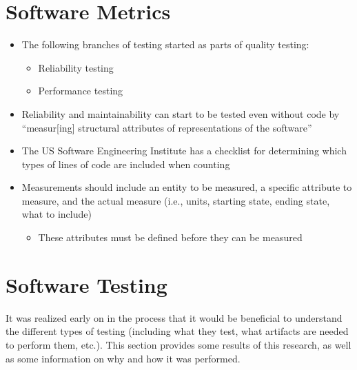 \section{Software Metrics}
\label{chap:notes:sec:software-metrics}

\begin{itemize}
      \item The following branches of testing started as parts of quality
            testing:
            \begin{itemize}
                  \item Reliability testing \citep[p.~18, ch.~10]{fenton_software_1997}
                  \item Performance testing \citep[p.~18, ch.~7]{fenton_software_1997}
            \end{itemize}
      \item Reliability and maintainability can start to be tested even without
            code by ``measur[ing] structural attributes of representations of the
            software'' \citep[p.~18]{fenton_software_1997}
      \item The US Software Engineering Institute has a checklist for determining
            which types of lines of code are included when counting
            \citep[pp.~30-31]{fenton_software_1997}
      \item Measurements should include an entity to be measured, a specific
            attribute to measure, and the actual measure (i.e., units, starting
            state, ending state, what to include) \citep[p.~36]{fenton_software_1997}
            \begin{itemize}
                  \item These attributes must be defined before they can be
                        measured \citep[p.~38]{fenton_software_1997}
            \end{itemize}
\end{itemize}

\section{Software Testing}
\label{chap:notes:sec:software-testing}

It was realized early on in the process that it would be beneficial to
understand the different types of testing (including what they test, what
artifacts are needed to perform them, etc.). This section provides some results
of this research, as well as some information on why and how it was performed.

